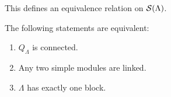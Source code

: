 
\begin{remark}
This defines an equivalence relation on $\mathcal S(\Lambda)$.
\end{remark}


\begin{proposition}\label{2.3.4}
  The following statements are equivalent:
  \begin{enumerate}
  \item $Q_\Lambda$ is connected.
  \item Any two simple modules are linked.
  \item $\Lambda$ has exactly one block.
  \end{enumerate}
\end{proposition}


